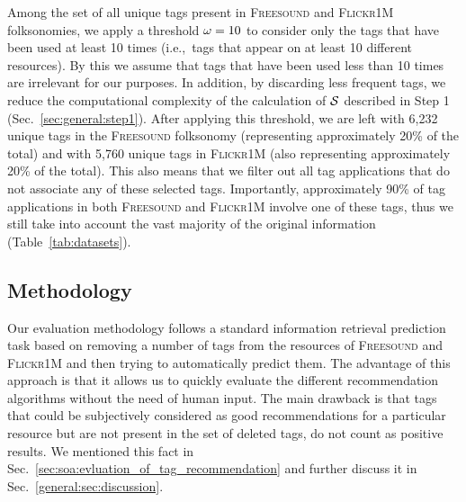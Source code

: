 Among the set of all unique tags present in \textsc{Freesound} and \textsc{Flickr1M} folksonomies, we apply a threshold $\omega=10$ to consider only the tags that have been used at least 10 times (i.e.,~tags that appear on at least 10 different resources). By this we assume that tags that have been used less than 10 times are irrelevant for our purposes. In addition, by discarding less frequent tags, we reduce the computational complexity of the calculation of $\mathcal{S}$ described in Step 1 (Sec.~\ref{sec:general:step1}). 
After applying this threshold, we are left with 6,232 unique tags in the \textsc{Freesound} folksonomy (representing approximately 20\% of the total) and with 5,760 unique tags in \textsc{Flickr1M} (also representing approximately 20\% of the total). This also means that we filter out all tag applications that do not associate any of these selected tags. Importantly, approximately 90\% of tag applications in both \textsc{Freesound} and \textsc{Flickr1M} involve one of these tags, thus we still take into account the vast majority of the original information (Table~\ref{tab:datasets}).


\subsection{Methodology}
\label{sec:general:evaluation_methodology_a}
Our evaluation methodology follows a standard information retrieval prediction task based on removing a number of tags from the resources of \textsc{Freesound} and \textsc{Flickr1M} and then trying to automatically predict them. The advantage of this approach is that it allows us to quickly evaluate the different recommendation algorithms without the need of human input. The main drawback is that tags that could be subjectively considered as good recommendations for a particular resource but are not present in the set of deleted tags, do not count as positive results. We mentioned this fact in Sec.~\ref{sec:soa:evluation_of_tag_recommendation} and further discuss it in Sec.~\ref{general:sec:discussion}.

